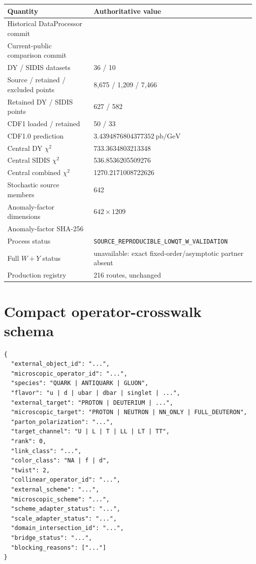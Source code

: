 \documentclass[11pt]{article}
\begin{document}
\begin{longtable}{L{0.45\textwidth}L{0.43\textwidth}}
\toprule
Quantity & Authoritative value\\
\midrule
\endhead
Historical DataProcessor commit & {\ttfamily\footnotesize{}}\\
Current-public comparison commit & {\ttfamily\footnotesize{}}\\
DY / SIDIS datasets & 36 / 10\\
Source / retained / excluded points & 8,675 / 1,209 / 7,466\\
Retained DY / SIDIS points & 627 / 582\\
CDF1 loaded / retained & 50 / 33\\
CDF1.0 prediction & \(3.4394876804377352\ \mathrm{pb/GeV}\)\\
Central DY \(\chi^2\) & 733.3634803213348\\
Central SIDIS \(\chi^2\) & 536.8536205509276\\
Central combined \(\chi^2\) & 1270.2171008722626\\
Stochastic source members & 642\\
Anomaly-factor dimensions & \(642\times1209\)\\
Anomaly-factor SHA-256 & {\ttfamily\footnotesize{}}\\
Process status & \nolinkurl{SOURCE_REPRODUCIBLE_LOWQT_W_VALIDATION}\\
Full \(W+Y\) status & unavailable: exact fixed-order/asymptotic partner absent\\
Production registry & 216 routes, unchanged\\
\bottomrule
\end{longtable}

\section{Compact operator-crosswalk schema}
\label{app:crosswalk-schema}

\begin{verbatim}
{
  "external_object_id": "...",
  "microscopic_operator_id": "...",
  "species": "QUARK | ANTIQUARK | GLUON",
  "flavor": "u | d | ubar | dbar | singlet | ...",
  "external_target": "PROTON | DEUTERIUM | ...",
  "microscopic_target": "PROTON | NEUTRON | NN_ONLY | FULL_DEUTERON",
  "parton_polarization": "...",
  "target_channel": "U | L | T | LL | LT | TT",
  "rank": 0,
  "link_class": "...",
  "color_class": "NA | f | d",
  "twist": 2,
  "collinear_operator_id": "...",
  "external_scheme": "...",
  "microscopic_scheme": "...",
  "scheme_adapter_status": "...",
  "scale_adapter_status": "...",
  "domain_intersection_id": "...",
  "bridge_status": "...",
  "blocking_reasons": ["..."]
}
\end{verbatim}
\end{document}
